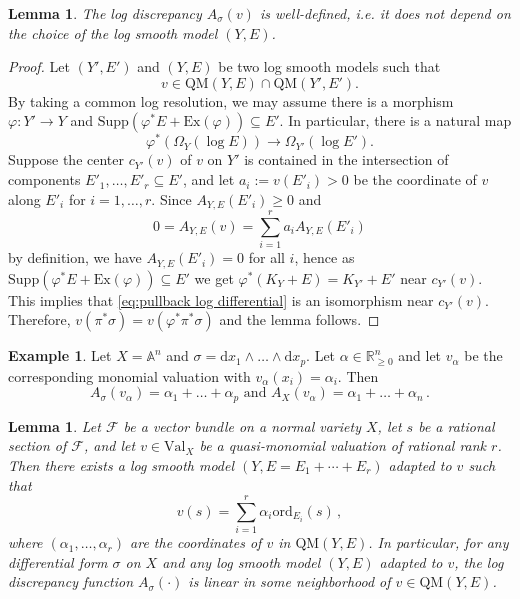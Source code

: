 \documentclass[12pt]{amsart}
\newtheorem{lem}[prop]{Lemma}
\theoremstyle{definition}
\newtheorem{expl}[prop]{Example}
\newcommand{\bR}{\mathbb{R}}
\newcommand{\bA}{\mathbb{A}}
\newcommand{\cF}{\mathcal{F}}
\newcommand{\rd}{\mathrm{d}}
\newcommand{\Supp}{\mathrm{Supp}}
\newcommand{\Ex}{\mathrm{Ex}}
\newcommand{\ord}{\mathrm{ord}}
\newcommand{\Val}{\mathrm{Val}}
\newcommand{\QM}{\mathrm{QM}}
\numberwithin{equation}{section}
\begin{document}
\begin{lem}
The log discrepancy $A_{\sigma}(v)$ is well-defined, i.e. it does not depend on the choice of the log smooth model $(Y,E)$.
\end{lem}

\begin{proof}
Let $(Y',E')$ and $(Y,E)$ be two log smooth models such that
\[
v\in \QM(Y,E) \cap \QM(Y',E').
\]
By taking a common log resolution, we may assume there is a morphism $\varphi\colon Y'\to Y$ and $\Supp(\varphi^*E+\Ex(\varphi))\subseteq E'$. In particular, there is a natural map 
\begin{equation} \label{eq:pullback log differential}
\varphi^*(\Omega_Y(\log E))\to \Omega_{Y'}(\log E').    
\end{equation}
Suppose the center $c_{Y'}(v)$ of $v$ on $Y'$ is contained in the intersection of components $E'_1,\ldots, E'_r\subseteq E'$, and let $a_i:=v(E'_i)>0$ be the coordinate of $v$ along $E'_i$ for $i=1,\ldots,r$. Since $A_{Y,E}(E'_i)\ge 0$ and
\[
0=A_{Y,E}(v)=\sum_{i=1}^r a_i A_{Y,E}(E'_i)
\]
by definition, we have $A_{Y,E}(E'_i)=0$ for all $i$, hence as $\Supp(\varphi^*E+\Ex(\varphi))\subseteq E'$ we get $\varphi^*(K_Y+E)=K_{Y'}+E'$ near $c_{Y'}(v)$. This implies that \eqref{eq:pullback log differential} is an isomorphism near $c_{Y'}(v)$. Therefore, $v(\pi^*\sigma) = v(\varphi^*\pi^*\sigma)$ and the lemma follows.
\end{proof}


\begin{expl}
Let $X=\bA^n$ and $\sigma = \rd x_1 \wedge\dots\wedge \rd x_p$. Let $\alpha\in \bR_{\ge 0}^n$ and let $v_\alpha$ be the corresponding monomial valuation with $v_\alpha(x_i)=\alpha_i$. Then 
\[
A_{\sigma}(v_\alpha) = \alpha_1+\dots+\alpha_p \mbox{ \ \ and \ \ }A_X(v_{\alpha})=\alpha_1+\dots+\alpha_n \, .
\]
\end{expl}

\begin{lem}\label{lem:A linear}
Let $\cF$ be a vector bundle on a normal variety $X$, let $s$ be a rational section of $\cF$, and let $v\in \Val_X$ be a quasi-monomial valuation of rational rank $r$. Then there exists a log smooth model $(Y,E=E_1+\cdots+E_r)$ adapted to $v$ such that
\[
v(s) = \sum_{i=1}^r \alpha_i \ord_{E_i}(s)\, ,
\]
where $(\alpha_1,\ldots,\alpha_r)$ are the coordinates of $v$ in $\QM(Y,E)$. In particular, for any differential form $\sigma$ on $X$ and any log smooth model $(Y,E)$ adapted to $v$, the log discrepancy function $A_\sigma(\cdot)$ is linear in some neighborhood of $v\in \QM(Y,E)$.
\end{lem}
\end{document}
